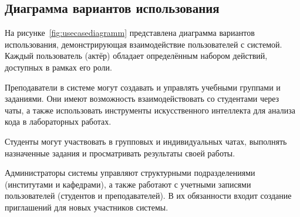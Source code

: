 \subsection{Диаграмма вариантов использования}

На рисунке~\ref{fig:usecasediagramm} представлена диаграмма вариантов использования, демонстрирующая взаимодействие пользователей с системой. Каждый пользователь (актёр) обладает определённым набором действий, доступных в рамках его роли.

Преподаватели в системе могут создавать и управлять учебными группами и заданиями. Они имеют возможность взаимодействовать со студентами через чаты, а также использовать инструменты искусственного интеллекта для анализа кода в лабораторных работах.

Студенты могут участвовать в групповых и индивидуальных чатах, выполнять назначенные задания и просматривать результаты своей работы.

Администраторы системы управляют структурными подразделениями (институтами и кафедрами), а также работают с учетными записями пользователей (студентов и преподавателей). В их обязанности входит создание приглашений для новых участников системы.